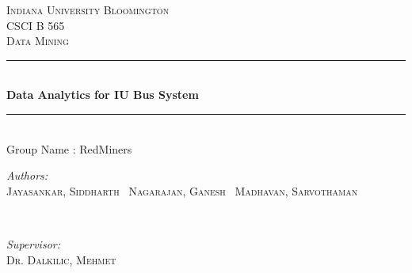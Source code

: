 \documentclass[12pt]{article}
\begin{document}
\begin{titlepage}

\newcommand{\HRule}{\rule{\linewidth}{0.5mm}}

\center 
 

\textsc{\LARGE Indiana University Bloomington}\\[1.5cm] 
\textsc{\Large CSCI B 565}\\[0.5cm] 
\textsc{\large Data Mining}\\[0.5cm] 


\HRule \\[0.4cm]
{ \huge \bfseries Data Analytics for IU Bus System}\\[0.4cm] 
\HRule \\[1.5cm]
\large Group Name : RedMiners \\
 

\begin{minipage}{0.4\textwidth}
\begin{flushleft} \large
\emph{Authors:}\\
\textsc{Jayasankar, Siddharth \ Nagarajan, Ganesh \ Madhavan, Sarvothaman } 
\end{flushleft}
\end{minipage}
~
\begin{minipage}{0.4\textwidth}
\begin{flushright} \large
\emph{Supervisor:} \\
\textsc{Dr. Dalkilic, Mehmet} 
\end{flushright}
\end{minipage}\\[2cm]




\end{titlepage}
\end{document}
